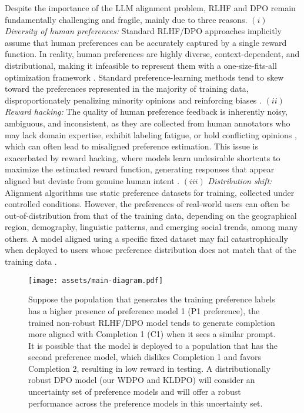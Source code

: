 Despite the importance of the LLM alignment problem,  RLHF and DPO remain fundamentally challenging and fragile, mainly due to three reasons. $(i)$ \emph{Diversity of human preferences:} Standard RLHF/DPO approaches implicitly assume that human preferences can be accurately captured by a single reward function.  In reality, human preferences are highly diverse, context-dependent, and distributional, making it infeasible to represent them with a one-size-fits-all optimization framework \cite{zhao2024group, durmus2023towards}. Standard preference-learning methods tend to skew toward the preferences represented in the majority of training data, disproportionately penalizing minority opinions and reinforcing biases \cite{chakraborty2024maxmin}.  $(ii)$ \emph{Reward hacking:} The quality of human preference feedback is inherently noisy, ambiguous, and inconsistent, as they are collected from human annotators who may lack domain expertise, exhibit labeling fatigue, or hold conflicting opinions \cite{zhang2024diverging, wu2024towards}, which can often lead to misaligned preference estimation. This issue is exacerbated by reward hacking, where models learn undesirable shortcuts to maximize the estimated reward function, generating responses that appear aligned but deviate from genuine human intent \cite{amodei2016concrete,skalse2022defining,eisenstein2023helping}. $(iii)$ \emph{Distribution shift:} Alignment algorithms use static preference datasets for training, collected under controlled conditions. However, the preferences of real-world users can often be out-of-distribution from that of the training data, depending on the geographical region, demography,  linguistic patterns, and emerging social trends, among many others. A model aligned using a specific fixed dataset may fail catastrophically when deployed to users whose preference distribution does not match that of the training data \cite{casper2023open,levine2023baseline,kirk2024understanding}.
\begin{figure*}[!ht]
    \centering 
    \texttt{[image: assets/main-diagram.pdf]}
    \caption{Suppose the population that generates the training preference labels has a higher presence of preference model 1 (P1 preference), the trained non-robust RLHF/DPO model tends to generate completion more aligned with Completion 1 (C1) when it sees a similar prompt. It is possible that the model is deployed to a population that has the second preference model, which dislikes Completion 1 and favors Completion 2, resulting in low reward in testing. A distributionally robust DPO model (our WDPO and KLDPO) will consider an uncertainty set of preference models and will offer a robust performance across the preference models in this uncertainty set.}
    \label{fig:main-diagram}
\end{figure*}

